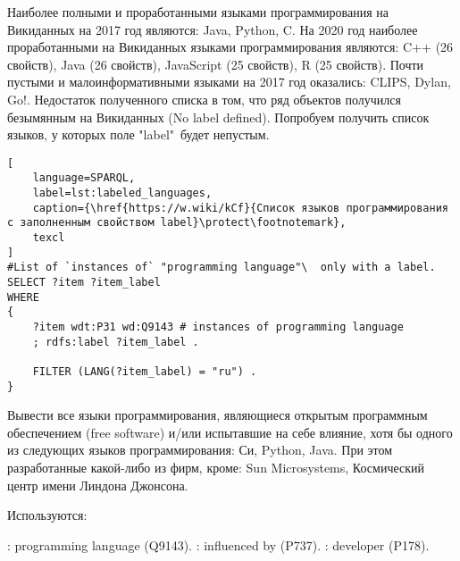 Наиболее полными и проработанными языками программирования на Викиданных на 2017 год являются: Java, Python, C. На 2020 год наиболее проработанными на Викиданных языками программирования являются: C++ (26 свойств), Java (26 свойств), JavaScript (25 свойств), R (25 свойств).
Почти пустыми и малоинформативными языками на 2017 год оказались: CLIPS, Dylan, Go!.
Недостаток полученного списка в том, что ряд объектов получился безымянным на Викиданных (No label defined). Попробуем получить список языков, у которых поле "label"\  будет непустым.

\begin{lstlisting}[
	language=SPARQL,
	label=lst:labeled_languages,
	caption={\href{https://w.wiki/kCf}{Список языков программирования с заполненным свойством label}\protect\footnotemark},
	texcl
]
#List of `instances of` "programming language"\  only with a label.
SELECT ?item ?item_label
WHERE
{
    ?item wdt:P31 wd:Q9143 # instances of programming language
    ; rdfs:label ?item_label . 

    FILTER (LANG(?item_label) = "ru") . 
}
\end{lstlisting}

Вывести все языки программирования, являющиеся открытым программным обеспечением (free software) и/или испытавшие на себе влияние, хотя бы одного из следующих языков программирования: Си, Python, Java. При этом разработанные какой-либо из фирм, кроме: Sun Microsystems, Космический центр имени Линдона Джонсона.

Используются:
\begin{itemize}
: programming language (Q9143).
: influenced by (P737).
: developer (P178).
\end{itemize}

